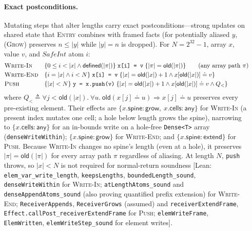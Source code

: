\documentclass[10pt,a4paper]{article}
\theoremstyle{definition}
\theoremstyle{remark}
\newcommand{\kw}[1]{\mathsf{#1}}
\newcommand{\extend}{\kw{extend}}
\newcommand{\grow}{\kw{grow}}
\newcommand{\any}{\kw{any}}
\newcommand{\old}{\kw{old}}
\newcommand{\len}[1]{|#1|}
\newcommand{\hoare}[3]{\{#1\}\;#2\;\{#3\}}
\newcommand{\code}[1]{\texttt{#1}}
\newcommand{\lean}[1]{\texttt{\small #1}}
\newcommand{\status}[1]{\textsf{\small[#1]}}
\begin{document}
\paragraph{Exact postconditions.}
Mutating steps that alter lengths carry exact postconditions---strong
updates on shared state that \textsc{Entry} combines with framed facts
(for potentially aliased $y$, \textsc{(Grow)} preserves $n\le\len y$ while
$\len y=n$ is dropped). For $N=2^{32}-1$, array $x$, value $v$, and
$\mathit{SafeInt}$ atom $i$:
{\small\begin{displaymath}
\begin{array}{@{}ll@{}}
\textsc{Write-In} & \hoare{0\le i<\len x\wedge\kw{defined}(\len\pi)}{\code{x[i] = v}}{\len\pi=\old(\len\pi)}\qquad (\text{any array path }\pi)\\[3pt]
\textsc{Write-End} & \hoare{i=\len x\wedge i<N}{\code{x[i] = v}}{\len x=\old(\len x)+1\wedge x[\old(\len x)]\doteq v}\\[3pt]
\textsc{Push} & \hoare{\len x<N}{\code{y = x.push(v)}}{\len x=\old(\len x)+1\wedge x[\old(\len x)]\doteq v\wedge Q_{<}}
\end{array}
\end{displaymath}}
where $Q_{<}\triangleq\forall j<\old(\len x).\ \forall u.\ \old(x[j]\doteq u)\Rightarrow x[j]\doteq u$
preserves every pre-existing element. Their effects are
$\{x.\kw{spine}:\grow,\ x.\kw{cells}:\any\}$ for \textsc{Write-In} (a
present index mutates one cell; a hole below length grows the spine),
narrowing to $\{x.\kw{cells}:\any\}$ for an in-bounds write on a hole-free
\code{Dense<T>} array (\lean{denseWriteWithin});
$\{x.\kw{spine}:\grow\}$ for \textsc{Write-End}; and
$\{x.\kw{spine}:\extend\}$ for \textsc{Push}.
Because \textsc{Write-In} changes no spine's length (even at a hole), it
preserves $\len\pi=\old(\len\pi)$ for every array path $\pi$ regardless
of aliasing. At length $N$, \code{push} throws, so $\len x<N$ is not
required for normal-return soundness
\status{Lean: \lean{elem\_var\_write\_length}, \lean{keepsLengths}, \lean{boundedLength\_sound}, \lean{denseWriteWithin} for \textsc{Write-In}; \lean{atLengthAtoms\_sound} and \lean{denseAppendAtoms\_sound} (also proving quantified prefix extension) for \textsc{Write-End}; \lean{ReceiverAppends}, \lean{ReceiverGrows} (assumed) and \lean{receiverExtendFrame}, \lean{Effect.callPost\_receiverExtendFrame} for \textsc{Push}; \lean{elemWriteFrame}, \lean{ElemWritten}, \lean{elemWriteStep\_sound} for element writes}.
\end{document}
